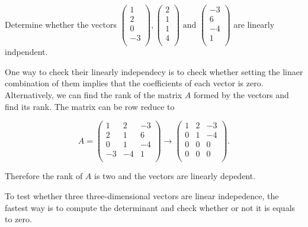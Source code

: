 \documentclass[a4paper,12pt]{report}
\begin{document}
{Determine whether the vectors \(\begin{pmatrix}
     1 \\
     2 \\
     0 \\
     -3 \\
\end{pmatrix}, \begin{pmatrix}
     2 \\
     1 \\
     1 \\
     4 \\
\end{pmatrix} \text { and } \begin{pmatrix}
     -3 \\
     6 \\
     -4 \\
     1 \\
\end{pmatrix}\) are linearly indpendent. }
{One way to check their linearly independecy is to check whether setting the linaer combination of them implies that the coefficients of each vector is zero. Alternatively, we can find the rank of the matrix \(A\) formed by the vectors and find its rank. The matrix can be row reduce to

\begin{equation}
    A = \begin{pmatrix}
        1 & 2 &  -3 \\
        2 & 1 &  6 \\
        0 & 1 &  -4 \\
        -3 & -4 &  1 \\
    \end{pmatrix} \to \begin{pmatrix}
        1 & 2 &  -3 \\
        0 & 1 &  -4 \\
        0 & 0 &  0 \\
        0 & 0 &  0 \\
    \end{pmatrix}.
\end{equation}

Therefore the rank of \(A\) is two and the vectors are linearly depedent.
} 


To test whether three three-dimensional vectors are linear indepedence, the fastest way is to compute the determinant and check whether or not it is equals to zero.
\end{document}
